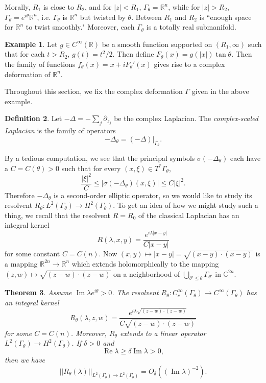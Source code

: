 \documentclass[12pt]{report}
\newcommand{\RR}{\mathbb{R}}
\newcommand{\CC}{\mathbb{C}}
\renewcommand{\Re}{\operatorname{Re}}
\renewcommand{\Im}{\operatorname{Im}}
\newcommand{\dfn}[1]{\emph{#1}\index{#1}}
\newtheorem{theorem}{Theorem}[chapter]
\theoremstyle{definition}
\newtheorem{definition}[theorem]{Definition}
\newtheorem{example}[theorem]{Example}
\begin{document}
Morally, $R_1$ is close to $R_2$, and for $|z| < R_1$, $\Gamma_\theta = \RR^n$, while for $|z| > R_2$, $\Gamma_\theta = e^{i\theta}\RR^n$, i.e. $\Gamma_\theta$ is $\RR^n$ but twisted by $\theta$. Between $R_1$ and $R_2$ is ``enough space for $\RR^n$ to twist smoothly." Moreover, each $\Gamma_\theta$ is a totally real submanifold.
\begin{example}
    Let $g \in C^\infty(\RR)$ be a smooth function supported on $(R_1, \infty)$ such that for each $t > R_2$, $g(t) = t^2/2$. Then define $F_\theta(x) = g(|x|)\tan \theta$. Then the family of functions $f_\theta(x) = x + iF_\theta'(x)$ gives rise to a complex deformation of $\RR^n$.
\end{example}
Throughout this section, we fix the complex deformation $\Gamma$ given in the above example.
\begin{definition}
    Let $-\Delta = -\sum_j \partial_{z_j}$ be the complex Laplacian. The \dfn{complex-scaled Laplacian} is the family of operators
    $$-\Delta_\theta = (-\Delta)|_{\Gamma_\theta}.$$
\end{definition}
By a tedious computation, we see that the principal symbols $\sigma(-\Delta_\theta)$ each have a $C = C(\theta) > 0$ such that for every $(x, \xi) \in T^*\Gamma_\theta$,
$$\frac{|\xi|^2}{C} \leq |\sigma(-\Delta_\theta)(x, \xi)| \leq C|\xi|^2.$$
Therefore $-\Delta_\theta$ is a second-order elliptic operator, so we would like to study its resolvent $R_\theta: L^2(\Gamma_\theta) \to H^2(\Gamma_\theta)$. To get an idea of how we might study such a thing, we recall that the resolvent $R = R_0$ of the classical Laplacian has an integral kernel
$$R(\lambda, x, y) = \frac{e^{i\lambda|x-y|}}{C|x-y|}$$
for some constant $C = C(n)$. Now $(x, y) \mapsto |x - y| = \sqrt{(x - y)\cdot(x-y)}$ is a mapping $\RR^{2n} \to \RR^n$ which extends holomorphically to the mapping $(z, w) \mapsto \sqrt{(z-w)\cdot(z-w)}$ on a neighborhood of $\bigcup_{\theta' \leq \theta} \Gamma_{\theta'}$ in $\CC^{2n}$.
\begin{theorem}
    Assume $\Im \lambda e^{i\theta} > 0$. The resolvent $R_\theta: C^\infty_c(\Gamma_\theta) \to C^\infty(\Gamma_\theta)$ has an integral kernel
    $$R_\theta(\lambda, z, w) = \frac{e^{i\lambda\sqrt{(z-w)\cdot(z-w)}}}{C\sqrt{(z-w)\cdot(z-w)}}$$
    for some $C = C(n)$. Moreover, $R_\theta$ extends to a linear operator $L^2(\Gamma_\theta) \to H^2(\Gamma_\theta)$. If $\delta > 0$ and
    $$\Re \lambda \geq \delta \Im \lambda > 0,$$
    then we have
    $$||R_\theta(\lambda)||_{L^2(\Gamma_\theta) \to L^2(\Gamma_\theta)} = O_\delta((\Im \lambda)^{-2}).$$
\end{theorem}
\end{document}

